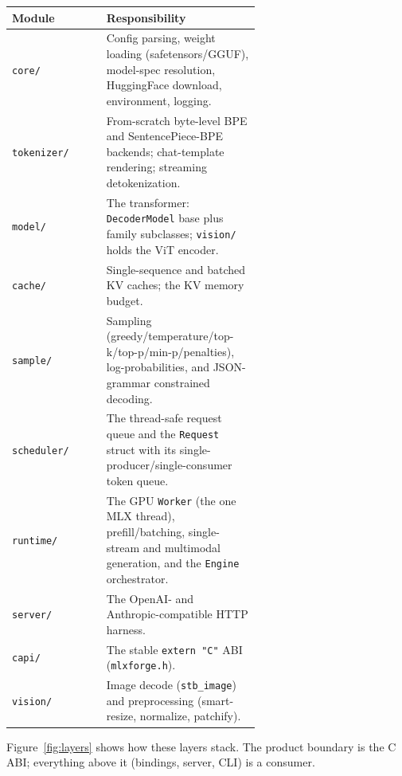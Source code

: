 \documentclass[11pt,a4paper]{report}
\newcommand{\code}[1]{\texttt{#1}}
\begin{document}
\begin{longtable}{@{}l p{0.62\linewidth}@{}}
\toprule
Module & Responsibility \\
\midrule
\endhead
\code{core/}      & Config parsing, weight loading (safetensors/GGUF), model-spec
                    resolution, HuggingFace download, environment, logging. \\
\code{tokenizer/} & From-scratch byte-level BPE and SentencePiece-BPE backends;
                    chat-template rendering; streaming detokenization. \\
\code{model/}     & The transformer: \code{DecoderModel} base plus family
                    subclasses; \code{vision/} holds the ViT encoder. \\
\code{cache/}     & Single-sequence and batched KV caches; the KV memory budget. \\
\code{sample/}    & Sampling (greedy/temperature/top-k/top-p/min-p/penalties),
                    log-probabilities, and JSON-grammar constrained decoding. \\
\code{scheduler/} & The thread-safe request queue and the \code{Request} struct
                    with its single-producer/single-consumer token queue. \\
\code{runtime/}   & The GPU \code{Worker} (the one MLX thread), prefill/batching,
                    single-stream and multimodal generation, and the \code{Engine}
                    orchestrator. \\
\code{server/}    & The OpenAI- and Anthropic-compatible HTTP harness. \\
\code{capi/}      & The stable \code{extern "C"} ABI (\code{mlxforge.h}). \\
\code{vision/}    & Image decode (\code{stb\_image}) and preprocessing
                    (smart-resize, normalize, patchify). \\
\bottomrule
\end{longtable}

Figure~\ref{fig:layers} shows how these layers stack. The product boundary is the
C ABI; everything above it (bindings, server, CLI) is a consumer.
\end{document}
